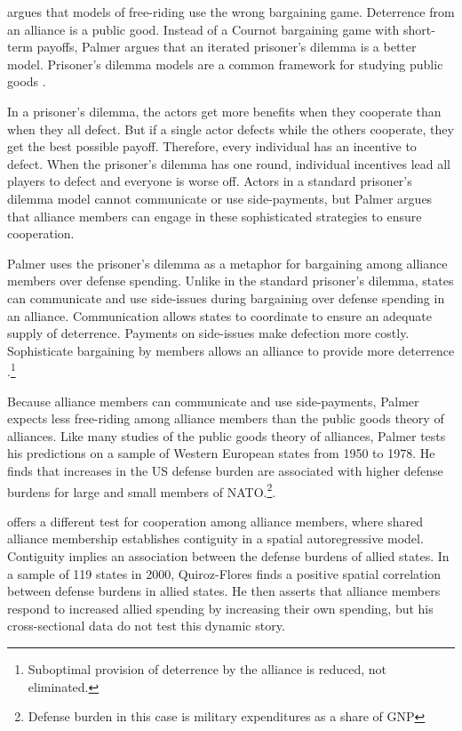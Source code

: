 \documentclass[12pt]{article}
\begin{document}
\citet{Palmer1990} argues that models of free-riding use the wrong bargaining game. 
Deterrence from an alliance is a public good. 
Instead of a Cournot bargaining game with short-term payoffs, Palmer argues that an iterated prisoner's dilemma is a better model. 
Prisoner's dilemma models are a common framework for studying public goods \citep{Axelrod1984}.


In a prisoner's dilemma, the actors get more benefits when they cooperate than when they all defect. 
But if a single actor defects while the others cooperate, they get the best possible payoff.
Therefore, every individual has an incentive to defect. 
When the prisoner's dilemma has one round, individual incentives lead all players to defect and everyone is worse off. 
Actors in a standard prisoner's dilemma model cannot communicate or use side-payments, but Palmer argues that alliance members can engage in these sophisticated strategies to ensure cooperation. 


Palmer uses the prisoner's dilemma as a metaphor for bargaining among alliance members over defense spending. 
Unlike in the standard prisoner's dilemma, states can communicate and use side-issues during bargaining over defense spending in an alliance.
Communication allows states to coordinate to ensure an adequate supply of deterrence. 
Payments on side-issues make defection more costly. 
Sophisticate bargaining by members allows an alliance to provide more deterrence \cite{Hardin1982}.\footnote{Suboptimal provision of deterrence by the alliance is reduced, not eliminated.} 


Because alliance members can communicate and use side-payments, Palmer expects less free-riding among alliance members than the public goods theory of alliances.  
Like many studies of the public goods theory of alliances, Palmer tests his predictions on a sample of Western European states from 1950 to 1978. 
He finds that increases in the US defense burden are associated with higher defense burdens for large and small members of NATO.\footnote{Defense burden in this case is military expenditures as a share of GNP}.  


\citet{QuirozFlores2011} offers a different test for cooperation among alliance members, where shared alliance membership establishes contiguity in a spatial autoregressive model.
Contiguity implies an association between the defense burdens of allied states. 
In a sample of 119 states in 2000, Quiroz-Flores finds a positive spatial correlation between defense burdens in allied states. 
He then asserts that alliance members respond to increased allied spending by increasing their own spending, but his cross-sectional data do not test this dynamic story.
\end{document}
